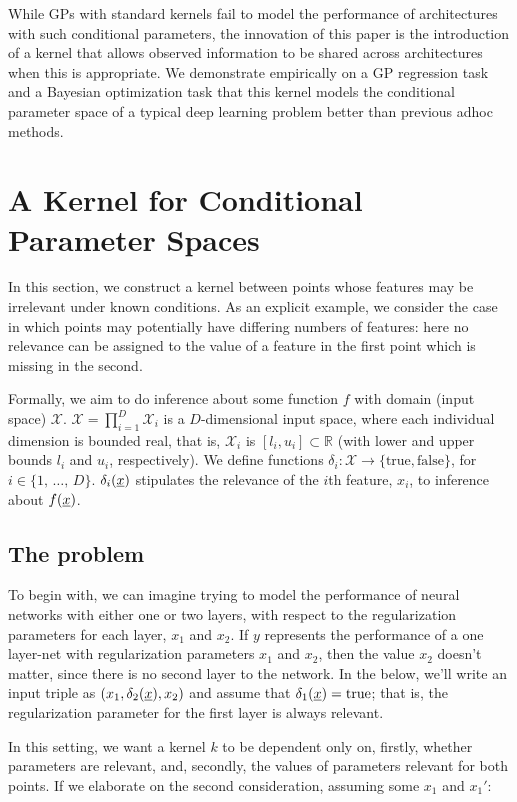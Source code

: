 \documentclass{article}
\newcommand{\vect}[1]{\underline{\smash{#1}}}
\renewcommand{\v}[1]{\vect{#1}}
\newcommand{\reals}{\mathds{R}}
\newcommand{\sX}{\mathcal{X}}
\begin{document}
While GPs with standard kernels fail to model the performance of architectures with such conditional parameters, the innovation of this paper is the introduction of a kernel that allows observed information to be shared across architectures when this is appropriate. We demonstrate empirically on a GP regression task and a Bayesian optimization task that this kernel models the conditional parameter space of a typical deep learning problem better than previous adhoc methods. 


\section{A Kernel for Conditional Parameter Spaces}
In this section, we construct a kernel between points whose features may be irrelevant under known conditions. As an explicit example, we consider the case in which points may potentially have differing numbers of features: here no relevance can be assigned to the value of a feature in the first point which is missing in the second. 

Formally, we aim to do inference about some function $f$ with domain (input space) $\sX$. $\sX = \prod_{i=1}^D \sX_i$ is a $D$-dimensional input space, where each individual dimension is 
 bounded real, that is, $\sX_i$ is $[l_i, u_i] \subset \reals$ (with lower and upper bounds $l_i$ and $u_i$, respectively). We define functions $\delta_i\colon \sX\to \{\text{true}, \text{false}\}$, for $i \in \{1,\,\ldots,\,D\}$. $\delta_i(\v{x})$ stipulates the relevance of the $i$th feature, $x_i$, to inference about $f(\v{x})$. 

\subsection{The problem}
To begin with, we can imagine trying to model the performance of neural networks with either one or two layers, with respect to the regularization parameters for each layer, $x_1$ and $x_2$.  If $y$ represents the performance of a one layer-net with regularization parameters $x_1$ and $x_2$, then the value $x_2$ doesn't matter, since there is no second layer to the network. In the below, we'll write an input triple as $(x_1, \delta_2(\v{x}), x_2)$ and assume that $\delta_1(\v{x}) = \text{true}$; that is, the regularization parameter for the first layer is always relevant. 

In this setting, we want a kernel $k$ to be dependent only on, firstly, whether parameters are relevant, and, secondly, the values of parameters relevant for both points. If we elaborate on the second consideration, assuming some $x_1$ and $x_1'$:
\end{document}
